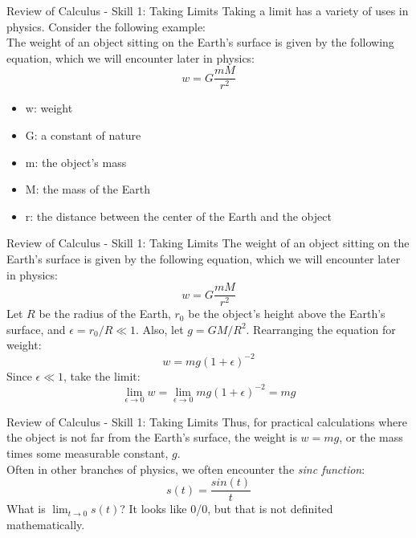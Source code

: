 \documentclass{beamer}
\begin{document}
\begin{frame}{Review of Calculus - Skill 1: Taking Limits}
Taking a limit has a variety of uses in physics.  Consider the following example:\\
\vspace{0.5cm}
\small
The weight of an object sitting on the Earth's surface is given by the following equation, which we will encounter later in physics: \\
\begin{equation}
w = G \frac{m M}{r^2}
\end{equation}
\begin{itemize}
\item w: weight
\item G: a constant of nature
\item m: the object's mass
\item M: the mass of the Earth
\item r: the distance between the center of the Earth and the object
\end{itemize}
\end{frame}

\begin{frame}{Review of Calculus - Skill 1: Taking Limits}
The weight of an object sitting on the Earth's surface is given by the following equation, which we will encounter later in physics: \\
\begin{equation}
w = G \frac{m M}{r^2}
\end{equation}
Let $R$ be the radius of the Earth, $r_0$ be the object's height above the Earth's surface, and $\epsilon = r_0/R \ll 1$.  Also, let $g = GM/R^2$.  Rearranging the equation for weight:\\
\begin{equation}
w = mg (1+\epsilon)^{-2}
\end{equation}
Since $\epsilon \ll 1$, take the limit:
\begin{equation}
\lim_{\epsilon \to 0} w = \lim_{\epsilon \to 0} mg (1+\epsilon)^{-2} = mg
\end{equation}
\end{frame}

\begin{frame}{Review of Calculus - Skill 1: Taking Limits}
Thus, for practical calculations where the object is not far from the Earth's surface, the weight is $w = mg$, or the mass times some measurable constant, $g$. \\
\vspace{0.5cm}
Often in other branches of physics, we often encounter the \textit{sinc function}:\\
\begin{equation}
s(t) = \frac{sin(t)}{t}
\end{equation}
What is $\lim_{t \to 0} s(t)$?  It looks like 0/0, but that is not definited mathematically.
\end{frame}
\end{document}
